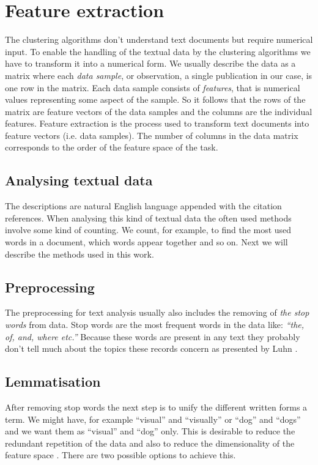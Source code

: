 
\section{Feature extraction}
The clustering algorithms don't understand text documents but 
require numerical input. To enable the handling of the textual 
data by the clustering algorithms we have to transform it into a
numerical form. We usually describe the data as a matrix where 
each \emph{data sample}, or observation, a single publication in 
our case, is one row in the matrix. Each data sample consists of
\emph{features}, that is numerical values representing some aspect
of the sample. So it follows that the rows of the matrix are 
feature vectors of the data samples and the columns are the 
individual features. Feature extraction is the process used to 
transform text documents into feature vectors (i.e. data samples).
The number of columns in the data matrix corresponds to the order 
of the feature space of the task.

\subsection{Analysing textual data}
The descriptions are natural English language appended with the 
citation references. When analysing 
this kind of textual data the often used methods involve some 
kind of counting. We count, for example, to find the most used 
words in a document, which words appear together and so on.
Next we will describe the methods used in this work.


\subsection{Preprocessing}
The preprocessing for text analysis usually also includes the 
removing of \emph{the stop words} from data. Stop words are the 
most frequent words in the data like: \emph{``the, of, and, where 
etc.''} Because these words are present in any text they probably 
don't tell much about the topics these records concern as 
presented by Luhn \cite{luhn_key_1960}.


\subsection{Lemmatisation}
After removing stop words the next step is to unify the 
different written forms a term. We might have, for example 
``visual'' and ``visually'' or ``dog'' and ``dogs'' and we want 
them as ``visual'' and ``dog'' only. This is desirable to reduce 
the redundant repetition of the data and also to reduce the 
dimensionality of the feature space
\cite{siemens_lemmatization_1996}\cite{hann_towards_1975}.
There are two possible options to achieve this. 

